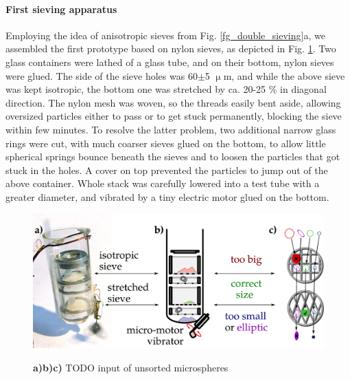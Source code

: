 \paragraph{First sieving apparatus}
Employing the idea of anisotropic sieves from Fig. \ref{fg_double_sieving}a, we assembled the first prototype based on nylon sieves, as depicted in Fig. \ref{fg_sieving1}. Two glass containers were lathed of a 
glass tube, and on their bottom, nylon sieves were glued. The side of the sieve holes was 60$\pm$5 $\upmu$m, and while the above sieve was kept isotropic, the bottom one was stretched by ca. 20-25 \% in diagonal direction. The nylon mesh was woven, so the threads easily bent aside, allowing oversized particles either to pass or to get stuck permanently, blocking the sieve within few minutes. To resolve the latter problem, two additional narrow glass rings were cut, with much coarser sieves glued on the bottom, to allow little spherical springs bounce beneath the sieves and to loosen the particles that got stuck in the holes. A cover on top prevented the particles to jump out of the above container. Whole stack was carefully lowered into a test tube with a greater diameter, and vibrated by a tiny electric motor glued on the bottom.
\begin{figure} \caption{\textbf{a)}\textbf{b)}\textbf{c)} TODO input of unsorted microspheres}  \centering \includegraphics[width=12cm]{img/expe/sieving1.pdf} \label{fg_sieving1} \end{figure} 




